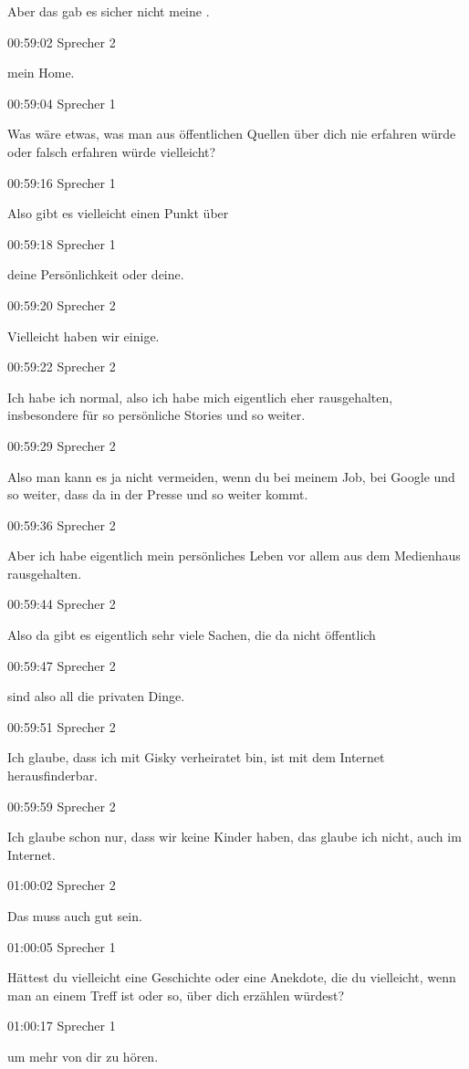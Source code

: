 Aber das gab es sicher nicht meine .

00:59:02 Sprecher 2

mein Home.

00:59:04 Sprecher 1

Was wäre etwas, was man aus öffentlichen Quellen über dich nie erfahren
würde oder falsch erfahren würde vielleicht?

00:59:16 Sprecher 1

Also gibt es vielleicht einen Punkt über

00:59:18 Sprecher 1

deine Persönlichkeit oder deine.

00:59:20 Sprecher 2

Vielleicht haben wir einige.

00:59:22 Sprecher 2

Ich habe ich normal, also ich habe mich eigentlich eher rausgehalten,
insbesondere für so persönliche Stories und so weiter.

00:59:29 Sprecher 2

Also man kann es ja nicht vermeiden, wenn du bei meinem Job, bei Google
und so weiter, dass da in der Presse und so weiter kommt.

00:59:36 Sprecher 2

Aber ich habe eigentlich mein persönliches Leben vor allem aus dem
Medienhaus rausgehalten.

00:59:44 Sprecher 2

Also da gibt es eigentlich sehr viele Sachen, die da nicht öffentlich

00:59:47 Sprecher 2

sind also all die privaten Dinge.

00:59:51 Sprecher 2

Ich glaube, dass ich mit Gisky verheiratet bin, ist mit dem Internet
herausfinderbar.

00:59:59 Sprecher 2

Ich glaube schon nur, dass wir keine Kinder haben, das glaube ich nicht,
auch im Internet.

01:00:02 Sprecher 2

Das muss auch gut sein.

01:00:05 Sprecher 1

Hättest du vielleicht eine Geschichte oder eine Anekdote, die du
vielleicht, wenn man an einem Treff ist oder so, über dich erzählen
würdest?

01:00:17 Sprecher 1

um mehr von dir zu hören.

